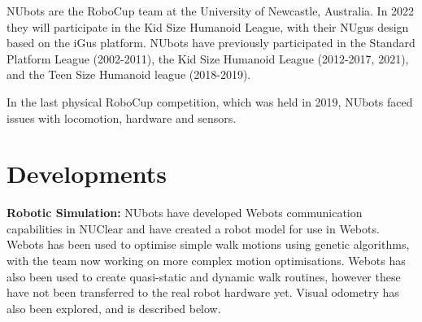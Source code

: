 \documentclass{llncs}
\begin{document}
NUbots are the RoboCup team at the University of Newcastle, Australia. In 2022 they will participate in the Kid Size Humanoid League, with their NUgus design based on the iGus platform\cite{Nimbro2018TDP}. NUbots have previously participated in the Standard Platform League (2002-2011), the Kid Size Humanoid League (2012-2017, 2021), and the Teen Size Humanoid league (2018-2019).


In the last physical RoboCup competition, which was held in 2019, NUbots faced issues with locomotion, hardware and sensors.




\section{Developments}


\noindent\textbf{Robotic Simulation:}   %
NUbots have developed Webots \cite{Webots} communication capabilities in NUClear \cite{HoulistonEtAl2016} and have created a robot model for use in Webots. Webots has been used to optimise simple walk motions using genetic algorithms, with the team now working on more complex motion optimisations. Webots has also been used to create quasi-static and dynamic walk routines, however these have not been transferred to the real robot hardware yet. Visual odometry has also been explored, and is described below.\newline
\end{document}
